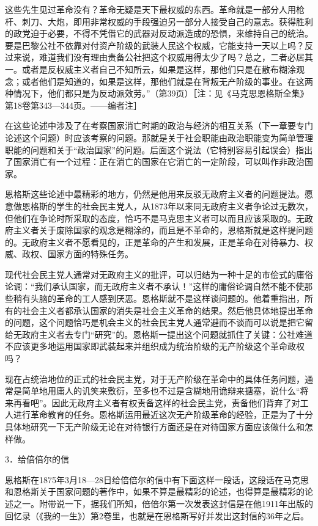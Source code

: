 \documentclass[UTF8, 12pt, a4paper]{ctexrep}
\begin{document}
这些先生见过革命没有？革命无疑是天下最权威的东西。革命就是一部分人用枪杆、刺刀、大炮，即用非常权威的手段强迫另一部分人接受自己的意志。获得胜利的政党迫于必要，不得不凭借它的武器对反动派造成的恐惧，来维持自己的统治。要是巴黎公社不依靠对付资产阶级的武装人民这个权威，它能支持一天以上吗？反过来说，难道我们没有理由责备公社把这个权威用得太少了吗？总之，二者必居其一。或者是反权威主义者自己不知所云，如果是这样，那他们只是在散布糊涂观念；或者他们是知道的，如果是这样，那他们就是在背叛无产阶级的事业。在这两种情况下，他们都只是为反动派效劳。”（第39页）［注：见《马克思恩格斯全集》第18卷第343—344页。——编者注］

在这些论述中涉及了在考察国家消亡时期的政治与经济的相互关系（下一章要专门论述这个问题）时应该考察的问题。那就是关于社会职能由政治职能变为简单管理职能的问题和关于“政治国家”的问题。后面这个说法（它特别容易引起误会）指出了国家消亡有一个过程：正在消亡的国家在它消亡的一定阶段，可以叫作非政治国家。

恩格斯这些论述中最精彩的地方，仍然是他用来反驳无政府主义者的问题提法。愿意做恩格斯的学生的社会民主党人，从1873年以来同无政府主义者争论过无数次，但他们在争论时所采取的态度，恰巧不是马克思主义者可以而且应该采取的。无政府主义者关于废除国家的观念是糊涂的，而且是不革命的，恩格斯就是这样提问题的。无政府主义者不愿看见的，正是革命的产生和发展，正是革命在对待暴力、权威、政权、国家方面的特殊任务。

现代社会民主党人通常对无政府主义的批评，可以归结为一种十足的市侩式的庸俗论调：“我们承认国家，而无政府主义者不承认！”这样的庸俗论调自然不能不使那些稍有头脑的革命的工人感到厌恶。恩格斯就不是这样谈问题的。他着重指出，所有的社会主义者都承认国家的消失是社会主义革命的结果。然后他具体地提出革命的问题，这个问题恰巧是机会主义的社会民主党人通常避而不谈而可以说是把它留给无政府主义者去专门“研究”的。恩格斯一提出这个问题就抓住了关键：公社难道不应该更多地运用国家即武装起来并组织成为统治阶级的无产阶级这个革命政权吗？

现在占统治地位的正式的社会民主党，对于无产阶级在革命中的具体任务问题，通常是简单地用庸人的讥笑来敷衍，至多也不过是含糊地用诡辩来搪塞，说什么“将来再看吧”。因此无政府主义者有权责备这样的社会民主党，责备他们背弃了对工人进行革命教育的任务。恩格斯运用最近这次无产阶级革命的经验，正是为了十分具体地研究一下无产阶级无论在对待银行方面还是在对待国家方面应该做什么和怎样做。

3．给倍倍尔的信

恩格斯在1875年3月18—28日给倍倍尔的信中有下面这样一段话，这段话在马克思和恩格斯关于国家问题的著作中，如果不算是最精彩的论述，也得算是最精彩的论述之一。附带说一下，据我们所知，倍倍尔第一次发表这封信是在他1911年出版的回忆录（《我的一生》）第2卷里，也就是在恩格斯写好并发出这封信的36年之后。
\end{document}
